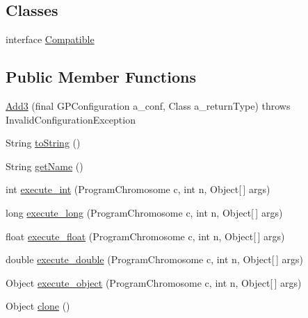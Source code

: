 \subsection*{Classes}
\begin{DoxyCompactItemize}
\item 
interface \hyperlink{interfaceorg_1_1jgap_1_1gp_1_1function_1_1_add3_1_1_compatible}{Compatible}
\end{DoxyCompactItemize}
\subsection*{Public Member Functions}
\begin{DoxyCompactItemize}
\item 
\hyperlink{classorg_1_1jgap_1_1gp_1_1function_1_1_add3_a39f0b3eb3fbdcc8e62fed05a254a317a}{Add3} (final G\-P\-Configuration a\-\_\-conf, Class a\-\_\-return\-Type)  throws Invalid\-Configuration\-Exception 
\item 
String \hyperlink{classorg_1_1jgap_1_1gp_1_1function_1_1_add3_a117cb9ae8aaa35ad01819fcd76aa718f}{to\-String} ()
\item 
String \hyperlink{classorg_1_1jgap_1_1gp_1_1function_1_1_add3_a7a86d653423e12958deb96ec59de78b7}{get\-Name} ()
\item 
int \hyperlink{classorg_1_1jgap_1_1gp_1_1function_1_1_add3_a5dd7b4af1ddf5fa3052fa4278de7d87f}{execute\-\_\-int} (Program\-Chromosome c, int n, Object\mbox{[}$\,$\mbox{]} args)
\item 
long \hyperlink{classorg_1_1jgap_1_1gp_1_1function_1_1_add3_a644667568a82eba83abddc983c038ba8}{execute\-\_\-long} (Program\-Chromosome c, int n, Object\mbox{[}$\,$\mbox{]} args)
\item 
float \hyperlink{classorg_1_1jgap_1_1gp_1_1function_1_1_add3_a944669eb2cdedc6feb23501af25796c1}{execute\-\_\-float} (Program\-Chromosome c, int n, Object\mbox{[}$\,$\mbox{]} args)
\item 
double \hyperlink{classorg_1_1jgap_1_1gp_1_1function_1_1_add3_a6ad7138a639c045bcb9d4818e744c782}{execute\-\_\-double} (Program\-Chromosome c, int n, Object\mbox{[}$\,$\mbox{]} args)
\item 
Object \hyperlink{classorg_1_1jgap_1_1gp_1_1function_1_1_add3_a5c1448abe514d25c6a2c2afc351ebcf4}{execute\-\_\-object} (Program\-Chromosome c, int n, Object\mbox{[}$\,$\mbox{]} args)
\item 
Object \hyperlink{classorg_1_1jgap_1_1gp_1_1function_1_1_add3_a9ff6a998602cc7cb369888e54c815d0e}{clone} ()
\end{DoxyCompactItemize}
